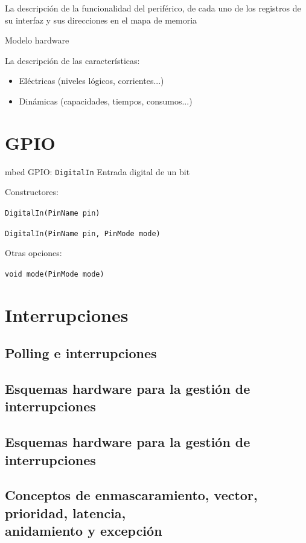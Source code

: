 \documentclass[a4paper]{book}
\begin{document}
La descripción de la funcionalidad del periférico, de cada uno de los registros de su interfaz y sus direcciones en el mapa de memoria

Modelo hardware

La descripción de las características:
\begin{itemize}
	\item Eléctricas (niveles lógicos, corrientes...)
	\item Dinámicas (capacidades, tiempos, consumos...)
\end{itemize}

\section{GPIO}

mbed GPIO: \verb|DigitalIn|
Entrada digital de un bit

Constructores:

\verb|DigitalIn(PinName pin)|

\verb|DigitalIn(PinName pin, PinMode mode)|

Otras opciones:

\verb|void mode(PinMode mode)|

\section{Interrupciones}

\subsection{Polling e interrupciones}

\subsection{Esquemas hardware para la gestión de interrupciones}

\subsection{Esquemas hardware para la gestión de interrupciones}

\subsection{\texorpdfstring{Conceptos de enmascaramiento, vector, prioridad, latencia,\\ anidamiento y excepción}{Conceptos de enmascaramiento, vector, prioridad, latencia, anidamiento y excepción}}
\end{document}
